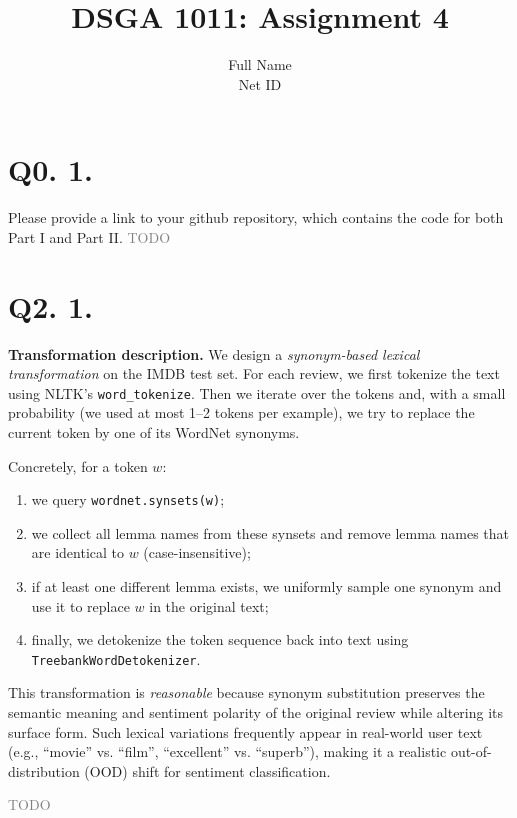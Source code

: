 \documentclass{article}
\title{DSGA 1011: Assignment 4}
\author{Full Name \\ Net ID}
\date{}
\begin{document}
\maketitle
\section*{Q0. 1.}
Please provide a link to your github repository, which contains the code for both Part I and Part II. \textcolor{gray}{TODO}
\section*{Q2. 1.}
\textbf{Transformation description.}
We design a \emph{synonym-based lexical transformation} on the IMDB test set. 
For each review, we first tokenize the text using NLTK’s \texttt{word\_tokenize}. 
Then we iterate over the tokens and, with a small probability (we used at most 1--2 tokens per example), 
we try to replace the current token by one of its WordNet synonyms.

Concretely, for a token $w$:
\begin{enumerate}
    \item we query \texttt{wordnet.synsets(w)};
    \item we collect all lemma names from these synsets and remove lemma names that are identical to $w$ (case-insensitive);
    \item if at least one different lemma exists, we uniformly sample one synonym and use it to replace $w$ in the original text;
    \item finally, we detokenize the token sequence back into text using \texttt{TreebankWordDetokenizer}.
\end{enumerate}

This transformation is \emph{reasonable} because synonym substitution preserves the semantic meaning and sentiment polarity of the original review while altering its surface form. 
Such lexical variations frequently appear in real-world user text (e.g., ``movie'' vs. ``film'', ``excellent'' vs. ``superb''), 
making it a realistic out-of-distribution (OOD) shift for sentiment classification.

\textcolor{gray}{TODO}
\end{document}
